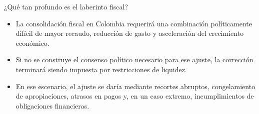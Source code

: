 
\begin{frame}{¿Qué tan profundo es el laberinto fiscal?}
    \begin{itemize}
        \item La consolidación fiscal en Colombia requerirá una combinación políticamente difícil de mayor recaudo, reducción de gasto y asceleración del crecimiento económico.
        \item Si no se construye el consenso político necesario para ese ajuste, la corrección terminará siendo impuesta por restricciones de liquidez.
        \item En ese escenario, el ajuste se daría mediante recortes abruptos, congelamiento de apropiaciones, atrasos en pagos y, en un caso extremo, incumplimientos de obligaciones financieras.
    \end{itemize}
\end{frame}